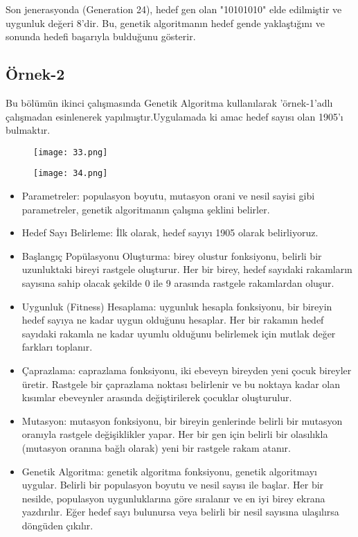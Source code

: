 \documentclass[12pt, a4paper]{article}
\begin{document}
\begin{flushleft}
Son jenerasyonda (Generation 24), hedef gen olan "10101010" elde edilmiştir ve uygunluk değeri 8'dir. Bu, genetik algoritmanın hedef gende yaklaştığını ve sonunda hedefi başarıyla bulduğunu gösterir.\\[20pt]
	
\subsection{Örnek-2}	
 Bu bölümün ikinci çalışmasında Genetik Algoritma kullanılarak 'örnek-1'adlı çalışmadan  esinlenerek  yapılmıştır.Uygulamada ki amac hedef sayısı olan 1905'ı bulmaktır.\\[20pt]


\begin{figure}[!h]
	\centering
	\texttt{[image: 33.png]}
	
\end{figure}
\begin{figure}[!h]
	\centering
	\texttt{[image: 34.png]}
	
\end{figure}
\newpage
\begin{itemize}
	\item Parametreler: populasyon boyutu, mutasyon orani ve nesil sayisi gibi parametreler, genetik algoritmanın çalışma şeklini belirler.
	\item Hedef Sayı Belirleme: İlk olarak, hedef sayıyı 1905 olarak belirliyoruz.
	\item Başlangıç Popülasyonu Oluşturma: birey olustur fonksiyonu, belirli bir uzunluktaki bireyi rastgele oluşturur. Her bir birey, hedef sayıdaki rakamların sayısına sahip olacak şekilde 0 ile 9 arasında rastgele rakamlardan oluşur.
	\item Uygunluk (Fitness) Hesaplama: uygunluk hesapla fonksiyonu, bir bireyin hedef sayıya ne kadar uygun olduğunu hesaplar. Her bir rakamın hedef sayıdaki rakamla ne kadar uyumlu olduğunu belirlemek için mutlak değer farkları toplanır.\clearpage
	\item  Çaprazlama: caprazlama fonksiyonu, iki ebeveyn bireyden yeni çocuk bireyler üretir. Rastgele bir çaprazlama noktası belirlenir ve bu noktaya kadar olan kısımlar ebeveynler arasında değiştirilerek çocuklar oluşturulur.
	\item Mutasyon: mutasyon fonksiyonu, bir bireyin genlerinde belirli bir mutasyon oranıyla rastgele değişiklikler yapar. Her bir gen için belirli bir olasılıkla (mutasyon oranına bağlı olarak) yeni bir rastgele rakam atanır.
	\item Genetik Algoritma: genetik algoritma fonksiyonu, genetik algoritmayı uygular. Belirli bir populasyon boyutu ve nesil sayısı ile başlar. Her bir nesilde, populasyon uygunluklarına göre sıralanır ve en iyi birey ekrana yazdırılır. Eğer hedef sayı bulunursa veya belirli bir nesil sayısına ulaşılırsa döngüden çıkılır.
	

\end{itemize}
\end{flushleft}
\end{document}
